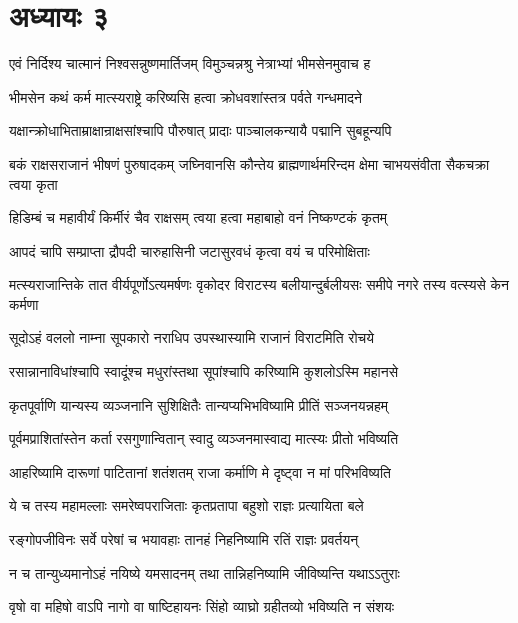 \chapter{अध्यायः ३}

\twolineshloka
{एवं निर्दिश्य चात्मानं निश्वसन्नुष्णमार्तिजम्}
{विमुञ्चन्नश्रु नेत्राभ्यां भीमसेनमुवाच ह}


\twolineshloka
{भीमसेन कथं कर्म मात्स्यराष्ट्रे करिष्यसि}
{हत्वा क्रोधवशांस्तत्र पर्वते गन्धमादने}


\twolineshloka
{यक्षान्क्रोधाभिताम्राक्षान्राक्षसांश्चापि पौरुषात्}
{प्रादाः पाञ्चालकन्यायै पद्मानि सुबहून्यपि}


\threelineshloka
{बकं राक्षसराजानं भीषणं पुरुषादकम्}
{जघ्निवानसि कौन्तेय ब्राह्मणार्थमरिन्दम}
{क्षेमा चाभयसंवीता सैकचक्रा त्वया कृता}


\twolineshloka
{हिडिम्बं च महावीर्यं किर्मीरं चैव राक्षसम्}
{त्वया हत्वा महाबाहो वनं निष्कण्टकं कृतम्}


\twolineshloka
{आपदं चापि सम्प्राप्ता द्रौपदी चारुहासिनी}
{जटासुरवधं कृत्वा वयं च परिमोक्षिताः}


\threelineshloka
{मत्स्यराजान्तिके तात वीर्यपूर्णोऽत्यमर्षणः}
{वृकोदर विराटस्य बलीयान्दुर्बलीयसः}
{समीपे नगरे तस्य वत्स्यसे केन कर्मणा}




\twolineshloka
{सूदोऽहं वललो नाम्ना सूपकारो नराधिप}
{उपस्थास्यामि राजानं विराटमिति रोचये}


\twolineshloka
{रसान्नानाविधांश्चापि स्वादूंश्च मधुरांस्तथा}
{सूपांश्चापि करिष्यामि कुशलोऽस्मि महानसे}


\twolineshloka
{कृतपूर्वाणि यान्यस्य व्यञ्जनानि सुशिक्षितैः}
{तान्यप्यभिभविष्यामि प्रीतिं सञ्जनयन्नहम्}


\twolineshloka
{पूर्वमप्राशितांस्तेन कर्ता रसगुणान्वितान्}
{स्वादु व्यञ्जनमास्वाद्य मात्स्यः प्रीतो भविष्यति}


\twolineshloka
{आहरिष्यामि दारूणां पाटितानां शतंशतम्}
{राजा कर्माणि मे दृष्ट्वा न मां परिभविष्यति}


\twolineshloka
{ये च तस्य महामल्लाः समरेष्वपराजिताः}
{कृतप्रतापा बहुशो राज्ञः प्रत्यायिता बले}


\twolineshloka
{रङ्गोपजीविनः सर्वे परेषां च भयावहाः}
{तानहं निहनिष्यामि रतिं राज्ञः प्रवर्तयन्}


\twolineshloka
{न च तान्युध्यमानोऽहं नयिष्ये यमसादनम्}
{तथा तान्निहनिष्यामि जीविष्यन्ति यथाऽऽतुराः}


\twolineshloka
{वृषो वा महिषो वाऽपि नागो वा षाष्टिहायनः}
{सिंहो व्याघ्रो ग्रहीतव्यो भविष्यति न संशयः}



